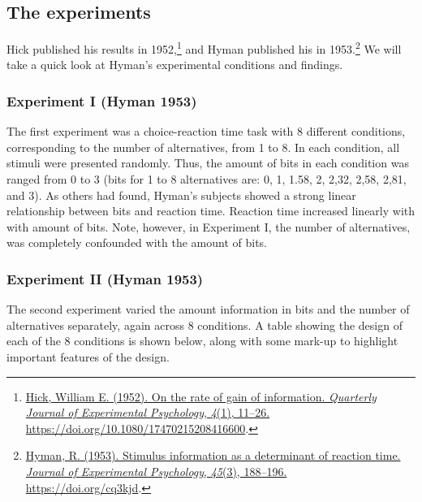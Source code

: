 \documentclass[
  oneside,
  12pt]{crumpbook}
\begin{document}
\hypertarget{the-experiments}{%
\subsection{The experiments}\label{the-experiments}}

Hick published his results in 1952,\footnote{\protect\hyperlink{ref-hickRateGainInformation1952}{Hick, William E. (1952). On the rate of gain of information. \emph{Quarterly Journal of Experimental Psychology}, \emph{4}(1), 11--26. \url{https://doi.org/10.1080/17470215208416600}}.} and Hyman published his in 1953.\footnote{\protect\hyperlink{ref-hymanStimulusInformationDeterminant1953}{Hyman, R. (1953). Stimulus information as a determinant of reaction time. \emph{Journal of Experimental Psychology}, \emph{45}(3), 188--196. \url{https://doi.org/cq3kjd}}.} We will take a quick look at Hyman's experimental conditions and findings.

\hypertarget{experiment-i-hyman-1953}{%
\subsubsection{Experiment I (Hyman 1953)}\label{experiment-i-hyman-1953}}

The first experiment was a choice-reaction time task with 8 different conditions, corresponding to the number of alternatives, from 1 to 8. In each condition, all stimuli were presented randomly. Thus, the amount of bits in each condition was ranged from 0 to 3 (bits for 1 to 8 alternatives are: 0, 1, 1.58, 2, 2,32, 2,58, 2,81, and 3). As others had found, Hyman's subjects showed a strong linear relationship between bits and reaction time. Reaction time increased linearly with with amount of bits. Note, however, in Experiment I, the number of alternatives, was completely confounded with the amount of bits.

\hypertarget{experiment-ii-hyman-1953}{%
\subsubsection{Experiment II (Hyman 1953)}\label{experiment-ii-hyman-1953}}

The second experiment varied the amount information in bits and the number of alternatives separately, again across 8 conditions. A table showing the design of each of the 8 conditions is shown below, along with some mark-up to highlight important features of the design.
\end{document}

